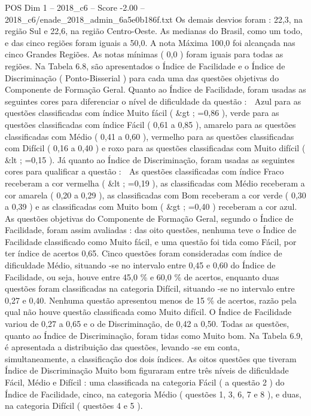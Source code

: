 \begin{textsample}{POS Dim 1 – 2018\_c6 – Score -2.00 – 2018\_c6/enade\_2018\_admin\_6a5e0b186f.txt}
Os demais desvios foram : 22,3, na região Sul e 22,6, na região Centro-Oeste.
As medianas do Brasil, como um todo, e das cinco regiões foram iguais a 50,0.
A nota Máxima 100,0 foi alcançada nas cinco Grandes Regiões.
As notas mínimas ( 0,0 ) foram iguais para todas as regiões.
Na Tabela 6.8, são apresentados o Índice de Facilidade e o Índice de Discriminação ( Ponto-Bisserial ) para cada uma das questões objetivas do Componente de Formação Geral.
Quanto ao Índice de Facilidade, foram usadas as seguintes cores para diferenciar o nível de dificuldade da questão :  Azul para as questões classificadas com índice Muito fácil ( \&gt ; =0,86 ), verde para as questões classificadas com índice Fácil ( 0,61 a 0,85 ), amarelo para as questões classificadas com Médio ( 0,41 a 0,60 ), vermelho para as questões classificadas com Difícil ( 0,16 a 0,40 ) e roxo para as questões classificadas com Muito difícil ( \&lt ; =0,15 ).
Já quanto ao Índice de Discriminação, foram usadas as seguintes cores para qualificar a questão :  As questões classificadas com índice Fraco receberam a cor vermelha ( \&lt ; =0,19 ), as classificadas com Médio receberam a cor amarela ( 0,20 a 0,29 ), as classificadas com Bom receberam a cor verde ( 0,30 a 0,39 ) e as classificadas com Muito bom ( \&gt ; =0,40 ) receberam a cor azul.
As questões objetivas do Componente de Formação Geral, segundo o Índice de Facilidade, foram assim avaliadas : das oito questões, nenhuma teve o Índice de Facilidade classificado como Muito fácil, e uma questão foi tida como Fácil, por ter índice de acertos 0,65.
Cinco questões foram consideradas com índice de dificuldade Médio, situando -se no intervalo entre 0,45 e 0,60 do Índice de Facilidade, ou seja, houve entre 45,0 \% e 60,0 \% de acertos, enquanto duas questões foram classificadas na categoria Difícil, situando -se no intervalo entre 0,27 e 0,40.
Nenhuma questão apresentou menos de 15 \% de acertos, razão pela qual não houve questão classificada como Muito difícil.
O Índice de Facilidade variou de 0,27 a 0,65 e o de Discriminação, de 0,42 a 0,50.
Todas as questões, quanto ao Índice de Discriminação, foram tidas como Muito bom.
Na Tabela 6.9, é apresentada a distribuição das questões, levando -se em conta, simultaneamente, a classificação dos dois índices.
As oitos questões que tiveram Índice de Discriminação Muito bom figuraram entre três níveis de dificuldade Fácil, Médio e Difícil : uma classificada na categoria Fácil ( a questão 2 ) do Índice de Facilidade, cinco, na categoria Médio ( questões 1, 3, 6, 7 e 8 ), e duas, na categoria Difícil ( questões 4 e 5 ).

\end{textsample}
